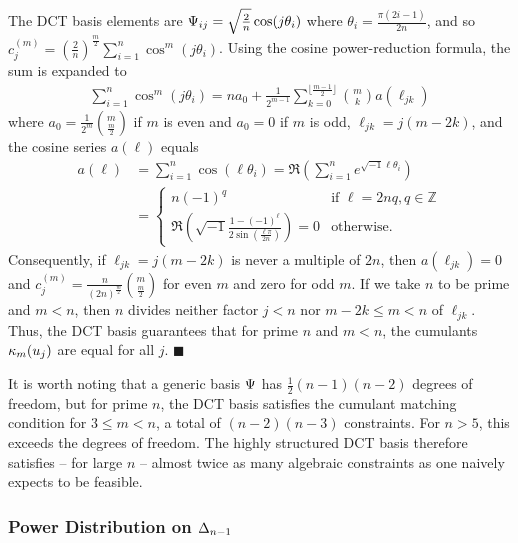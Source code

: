 The \gls*{DCT} basis elements are $\Psi_{ij} = \sqrt{\frac{2}{n}} \cos(j \theta_{i})$ where $\theta_{i} = \frac{\pi (2i-1)}{2n}$, and so $c_{j}^{(m)} = \left(\frac{2}{n}\right)^{\frac{m}{2}} \sum_{i=1}^{n} \cos^m(j \theta_{i})$.
Using the cosine power-reduction formula, the sum is expanded to
\begin{align}
    \sum_{i=1}^{n} \cos^{m}(j \theta_{i}) = n a_0 + \frac{1}{2^{m-1}} \sum_{k=0}^{\lfloor \frac{m-1}{2} \rfloor} \binom{m}{k} a(\ell_{jk})
\end{align}
where $a_0 = \frac{1}{2^{m}} \binom{m}{\frac{m}{2}}$ if $m$ is even and $a_0 = 0$ if $m$ is odd, $\ell_{jk} = j(m - 2k)$, and the cosine series $a(\ell)$ equals
\begin{align}
    a(\ell) & = \sum_{i=1}^{n} \cos (\ell \theta_{i}) = \Re \left( \sum_{i=1}^{n} e^{\sqrt{-1}\ell\theta_{i}} \right) \\
            & = \begin{cases}
        n (-1)^{q}                                                                       & \text{if } \ell = 2nq, q \in \mathbb{Z} \\
        \Re \left( \sqrt{-1} \frac{1 - (-1)^\ell}{2\sin(\frac{\ell\pi}{2n})} \right) = 0 & \text{otherwise.}
    \end{cases}
\end{align}
Consequently, if $\ell_{jk} = j(m-2k)$ is never a multiple of $2n$, then $a(\ell_{jk})=0$ and $c_{j}^{(m)} = \frac{n}{(2n)^{\frac{m}{2}}} \binom{m}{\frac{m}{2}}$ for even $m$ and zero for odd $m$.
If we take $n$ to be prime and $m < n$, then $n$ divides neither factor $j < n$ nor $m-2k \le m < n$ of $\ell_{jk}$.
Thus, the \gls*{DCT} basis guarantees that for prime $n$ and $m < n$, the cumulants $\kappa_{m}(u_j)$ are equal for all $j$. $\blacksquare$

It is worth noting that a generic basis $\Psi$ has $\frac{1}{2}(n-1)(n-2)$ degrees of freedom, but for prime $n$, the \gls*{DCT} basis satisfies the cumulant matching condition for $3 \le m < n$, a total of $(n-2)(n-3)$ constraints.
For $n>5$, this exceeds the degrees of freedom.
The highly structured \gls*{DCT} basis therefore satisfies -- for large $n$ -- almost twice as many algebraic constraints as one naively expects to be feasible.

\subsubsection{Power Distribution on \texorpdfstring{$\Delta_{n-1}$}{DeltaNMinusOne}}

